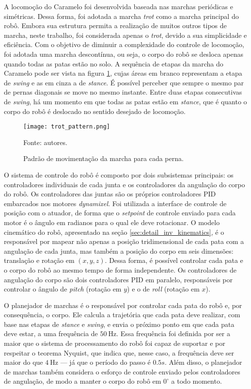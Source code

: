 \documentclass[conference]{IEEEtran}
\begin{document}
A locomoção do Caramelo foi desenvolvida baseada nas marchas periódicas e simétricas. Dessa forma, foi adotada a marcha \textit{trot} como a marcha principal do robô. Embora sua estrutura permita a realização de muitos outros tipos de marcha, neste trabalho, foi considerada apenas o \textit{trot}, devido a sua simplicidade e eficiência. Com o objetivo de diminuir a complexidade do controle de locomoção, foi adotada uma marcha descontínua, ou seja, o corpo do robô se desloca apenas quando todas as patas estão no solo. A sequência de etapas da marcha do Caramelo pode ser vista na figura \ref{fig:trot_pattern}, cujas áreas em branco representam a etapa de \textit{swing} e as em cinza a de \textit{stance}. É possível perceber que sempre o mesmo par de pernas diagonais se move no mesmo instante. Entre duas etapas consecutivas de \textit{swing}, há um momento em que todas as patas estão em \textit{stance}, que é quanto o corpo do robô é deslocado no sentido desejado de locomoção.

\begin{figure}[htbp]
  \centering
  \texttt{[image: trot\_pattern.png]}
  \vfill
  \caption{Padrão de movimentação da marcha para cada perna.}
  Fonte: autores.
  \label{fig:trot_pattern}
\end{figure}

O sistema de controle do robô é composto por dois subsistemas principais: os controladores individuais de cada junta e os controladores da angulação do corpo do robô. Os controladores das juntas são os próprios controladores PID embarcados nos motores \textit{dynamixel}. Foi utilizada a interface de controle de posição com o atuador, de forma que o \textit{setpoint} de controle enviado para cada motor é o ângulo em radianos para o qual ele deve rotacionar. O modelo cinemático do robô, apresentado na seção \ref{sec:detail_inv_kinematics}, é o responsável por mapear não apenas a posição tridimensional de cada pata com a angulação de cada junta, mas também a posição do corpo em seis dimensões: translação e rotação em $(x, y, z)$. Dessa forma, é possível controlar cada pata e o corpo do robô ao mesmo tempo de forma independente. Os controladores de angulação do corpo são dois controladores PID em paralelo, responsáveis por controlar o ângulo de \textit{pitch} (rotação em $y$) e o de \textit{roll} (rotação em $x$).

O planejador de marchas é o responsável por controlar cada pata do robô e, por consequência, o corpo. Ele calcula a trajetória que cada pata deve realizar, com base nas etapas de \textit{stance} e \textit{swing}, e envia o próximo ponto em que cada pata deve estar, a uma frequência de $\SI{50}{\hertz}$. Essa frequência foi definida por ser a maior que o sistema de processamento do robô foi capaz de suportar e por respeitar o teorema Nyquist, que indica que, nesse caso, a frequência deve ser maior do que $\SI{4}{\hertz}$ --- já que o período do passo é $0.5 s$. Além disso, o planejador de marchas também considera o esforço de controle enviado pelos controladores de angulação, de modo a manter o corpo do robô em $0^{\circ}$ a todo momento.
\end{document}
